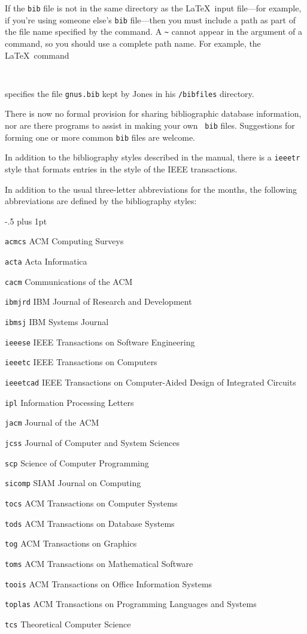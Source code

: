 If the {\tt bib} file is not in the same directory as the \LaTeX\ input
file---for example, if you're using someone else's {\tt bib}
file---then you must include a path as part of the file name specified
by the \hbox{\verb||} command.  A \verb|~| cannot appear
in the argument of a \hbox{\verb||} command, so you should
use a complete path name.  For example, the \LaTeX\ command
\begin{verbatim}
     
\end{verbatim}
specifies the file \mbox{\tt gnus.bib} kept by Jones in his 
\mbox{\tt /bibfiles} directory.


There is now no formal provision for sharing bibliographic database
information, nor are there programs to assist in making your own {\tt
bib} files.  Suggestions for forming one or more common {\tt bib} files
are welcome.

In addition to the bibliography styles described in the manual, there
is a {\tt ieeetr} style that formats entries in the style of the IEEE
transactions.

In addition to the usual three-letter abbreviations for the months, the
following abbreviations are defined by the bibliography styles:
\begin{list}{}{ \itemindent-.5\leftmargin
       \itemsep=2pt plus 1pt
       \let\makelabel\descriptionlabel}\it
\item[\tt acmcs] ACM Computing Surveys
\item[\tt acta] Acta Informatica
\item[\tt cacm] Communications of the ACM
\item[\tt ibmjrd] IBM Journal of Research and Development
\item[\tt ibmsj] IBM Systems Journal
\item[\tt ieeese] IEEE Transactions on Software Engineering
\item[\tt ieeetc] IEEE Transactions on Computers
\item[\tt ieeetcad]
 IEEE Transactions on Computer-Aided Design of Integrated Circuits
\item[\tt ipl] Information Processing Letters
\item[\tt jacm] Journal of the ACM
\item[\tt jcss] Journal of Computer and System Sciences
\item[\tt scp] Science of Computer Programming
\item[\tt sicomp] SIAM Journal on Computing
\item[\tt tocs] ACM Transactions on Computer Systems
\item[\tt tods] ACM Transactions on Database Systems
\item[\tt tog] ACM Transactions on Graphics
\item[\tt toms] ACM Transactions on Mathematical Software
\item[\tt toois] ACM Transactions on Office Information Systems
\item[\tt toplas] ACM Transactions on Programming Languages and Systems
\item[\tt tcs] Theoretical Computer Science
\end{list}

